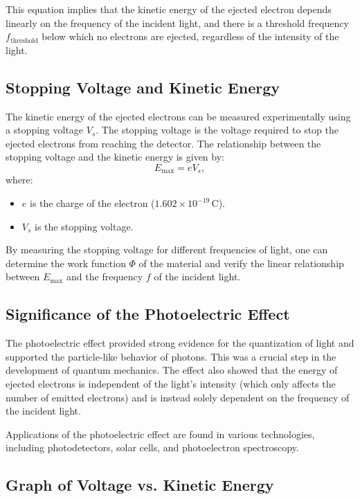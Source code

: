 \documentclass{report}
\begin{document}
This equation implies that the kinetic energy of the ejected electron depends linearly on the frequency of the incident light, and there is a threshold frequency $f_{\text{threshold}}$ below which no electrons are ejected, regardless of the intensity of the light.

\subsection{Stopping Voltage and Kinetic Energy}

The kinetic energy of the ejected electrons can be measured experimentally using a stopping voltage $V_s$. The stopping voltage is the voltage required to stop the ejected electrons from reaching the detector. The relationship between the stopping voltage and the kinetic energy is given by:
\[
	E_{\text{max}} = e V_s,
\]
where:
\begin{itemize}
	\item $e$ is the charge of the electron ($1.602 \times 10^{-19} \, \text{C}$).
	\item $V_s$ is the stopping voltage.
\end{itemize}

By measuring the stopping voltage for different frequencies of light, one can determine the work function $\Phi$ of the material and verify the linear relationship between $E_{\text{max}}$ and the frequency $f$ of the incident light.

\subsection{Significance of the Photoelectric Effect}

The photoelectric effect provided strong evidence for the quantization of light and supported the particle-like behavior of photons. This was a crucial step in the development of quantum mechanics. The effect also showed that the energy of ejected electrons is independent of the light’s intensity (which only affects the number of emitted electrons) and is instead solely dependent on the frequency of the incident light.

Applications of the photoelectric effect are found in various technologies, including photodetectors, solar cells, and photoelectron spectroscopy.

\subsection{Graph of Voltage vs. Kinetic Energy}
\end{document}
